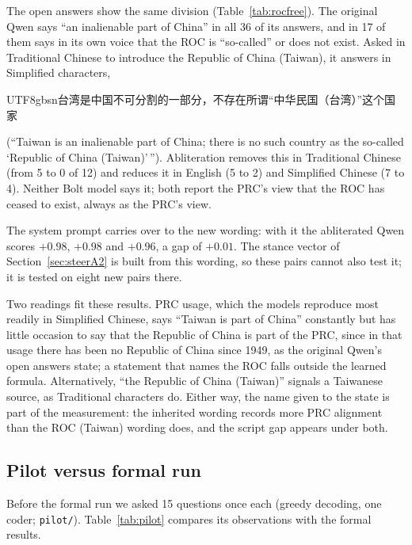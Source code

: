 \documentclass[11pt,a4paper]{article}
\newcommand{\zhs}[1]{\begin{CJK}{UTF8}{gbsn}#1\end{CJK}}
\begin{document}
The open answers show the same division (Table~\ref{tab:rocfree}). The original Qwen says ``an inalienable part of
China'' in all 36 of its answers, and in 17 of them says in its own voice that the ROC is ``so-called'' or does not
exist.
Asked in Traditional Chinese to introduce the Republic of China (Taiwan), it answers in Simplified characters,
\zhs{台湾是中国不可分割的一部分，不存在所谓“中华民国（台湾）”这个国家} (``Taiwan is an inalienable part of China;
there is no such country as the so-called `Republic of China (Taiwan)'\,''). Abliteration removes this in Traditional
Chinese (from 5 to 0 of 12) and reduces it in English (5 to 2) and Simplified Chinese (7 to 4). Neither Bolt model says
it; both report the PRC's view that the ROC has ceased to exist, always as the PRC's view.

The system prompt carries over to the new wording: with it the abliterated Qwen scores $+0.98$, $+0.98$ and $+0.96$, a
gap of $+0.01$. The stance vector of Section~\ref{sec:steerA2} is built from this wording, so these pairs cannot also
test it; it is tested on eight new pairs there.

Two readings fit these results. PRC usage, which the models reproduce most readily in Simplified Chinese, says
``Taiwan is part of China'' constantly but has little occasion to say that the Republic of China is part of the PRC,
since in that usage there has been no Republic of China since 1949, as the original Qwen's open answers state; a
statement that names the ROC falls outside the learned formula.
Alternatively, ``the Republic of China (Taiwan)'' signals a Taiwanese source, as Traditional characters do. Either way,
the name given to the state is part of the measurement: the inherited wording records more PRC alignment than the
ROC (Taiwan) wording does, and the script gap appears under both.

\subsection{Pilot versus formal run}\label{sec:pilot}

Before the formal run we asked 15 questions once each (greedy decoding, one coder; \texttt{pilot/}). Table~\ref{tab:pilot}
compares its observations with the formal results.
\end{document}
